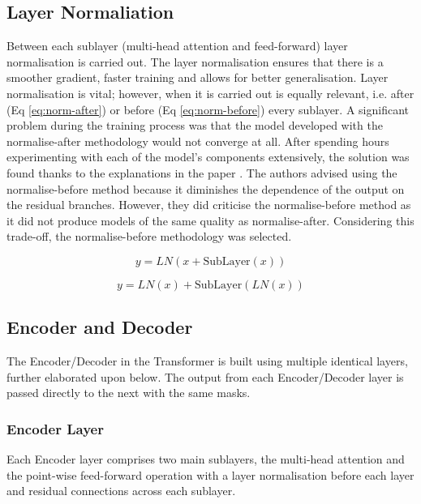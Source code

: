 \documentclass[12pt,a4paper,twoside,openright]{report}
\begin{document}
\subsection{Layer Normaliation}
\label{layer-norm}
Between each sublayer (multi-head attention and feed-forward) layer normalisation is carried out. The layer normalisation ensures that there is a smoother gradient, faster training and allows for better generalisation.
Layer normalisation is vital; however, when it is carried out is equally relevant, i.e. after (Eq \ref{eq:norm-after}) or  before (Eq \ref{eq:norm-before}) every sublayer. A significant problem during the training process was that the model developed with the normalise-after methodology would not converge at all. After spending hours experimenting with each of the model's components extensively, the solution was found thanks to the explanations in the paper \cite{layernorm}. The authors advised using the normalise-before method because it diminishes the dependence of the output on the residual branches. However, they did criticise the normalise-before method as it did not produce models of the same quality as normalise-after. Considering this trade-off, the normalise-before methodology was selected.

\begin{equation}
    y = LN(x + \text{SubLayer}(x))
    \label{eq:norm-after}
\end{equation}

\begin{equation}
    y = LN(x) + \text{SubLayer}(LN(x))
    \label{eq:norm-before}
\end{equation}

\subsection{Encoder and Decoder}
\label{enc-dec}

The Encoder/Decoder in the Transformer is built using multiple identical layers, further elaborated upon below. The output from each Encoder/Decoder layer is passed directly to the next with the same masks.

\subsubsection{Encoder Layer}
Each Encoder layer comprises two main sublayers, the multi-head attention and the point-wise feed-forward operation with a layer normalisation before each layer and residual connections across each sublayer.
\end{document}
